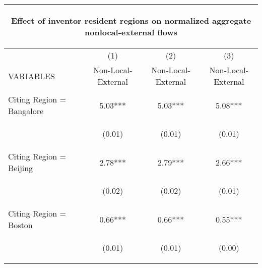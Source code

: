 \begin{center}
\begin{tabular}{lccc}
\multicolumn{4}{c}{\begin{large}Effect of inventor resident regions on normalized aggregate nonlocal-external flows \label{nonlocalexternal}\end{large}} \\ \hline
 & (1) & (2) & (3) \\
VARIABLES & Non-Local-External & Non-Local-External & Non-Local-External \\ \hline
\vspace{4pt} & \begin{footnotesize}\end{footnotesize} & \begin{footnotesize}\end{footnotesize} & \begin{footnotesize}\end{footnotesize} \\
Citing Region = Bangalore & 5.03*** & 5.03*** & 5.08*** \\
\vspace{4pt} & \begin{footnotesize}(0.01)\end{footnotesize} & \begin{footnotesize}(0.01)\end{footnotesize} & \begin{footnotesize}(0.01)\end{footnotesize} \\
Citing Region = Beijing & 2.78*** & 2.79*** & 2.66*** \\
\vspace{4pt} & \begin{footnotesize}(0.02)\end{footnotesize} & \begin{footnotesize}(0.02)\end{footnotesize} & \begin{footnotesize}(0.01)\end{footnotesize} \\
Citing Region = Boston & 0.66*** & 0.66*** & 0.55*** \\
\vspace{4pt} & \begin{footnotesize}(0.01)\end{footnotesize} & \begin{footnotesize}(0.01)\end{footnotesize} & \begin{footnotesize}(0.00)\end{footnotesize} \\

\end{tabular}
\end{center}
